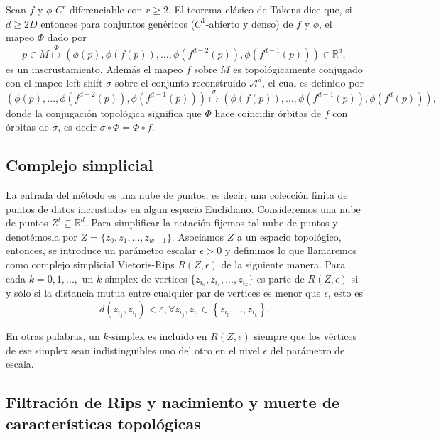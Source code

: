 Sean $f$ y $\phi$ $C^r$-diferenciable con $r\geq 2$. El teorema clásico de Takens dice que, si $d\geq 2D$ entonces para conjuntos genéricos ($C^1$-abierto y denso) de $f$ y $\phi$, el mapeo $\Phi$ dado por
\[
p \in M \stackrel{\Phi}{\mapsto}\left(\phi(p), \phi(f(p)), \ldots, \phi\left(f^{d-2}(p)\right), \phi\left(f^{d-1}(p)\right)\right) \in \mathbb{R}^{d},
\]
es un inscrustamiento. Además el mapeo $f$ sobre $M$ es topológicamente conjugado con el mapeo left-shift $\sigma$ sobre el conjunto reconstruido $\mathcal{A}^d$, el cual es definido por
\[
\left(\phi(p), \ldots, \phi\left(f^{d-2}(p)\right), \phi\left(f^{d-1}(p)\right)\right) \stackrel{\sigma}{\mapsto}\left(\phi(f(p)), \ldots, \phi\left(f^{d-1}(p)\right), \phi\left(f^{d}(p)\right)\right),
\]
donde la conjugación topológica significa que $\Phi$ hace coincidir órbitas de $f$ con órbitas de $\sigma$, es decir $\sigma \circ \Phi = \Phi \circ f$.
   
\subsection{Complejo simplicial}
\label{funda_mental_complejoSim}

La entrada del método es una nube de puntos, es decir, una colección finita de puntos de datos incrustados en algun espacio Euclidiano. Consideremos una nube de puntos ${Z^t} \subseteq  \mathbb{R}^{d}$. Para simplificar la notación fijemos tal nube de puntos y denotémosla por $Z=\{z_0,z_1,...,z_{w-1}\}$. Asociamos $Z$ a un espacio topológico, entonces, se introduce un parámetro escalar $\epsilon > 0$ y definimos lo que llamaremos como complejo simplicial Vietoris-Rips $R(Z,\epsilon)$ de la siguiente manera.
Para cada $k=0,1,...,$ un $k$-simplex de vertices $\{ z_{i_0},z_{i_1},...,z_{i_k} \}$ es parte de $R(Z,\epsilon)$ si y sólo si la distancia mutua entre cualquier par de vertices es menor que $\epsilon$, esto es
\[
d\left(z_{i_{j}}, z_{i_{l}}\right)<\varepsilon, \forall z_{i_{j}}, z_{i_{l}} \in\left\{z_{i_{0}}, \ldots, z_{i_{k}}\right\}.
\]

En otras palabras, un $k$-simplex es incluido en $R(Z,\epsilon)$ siempre que los vértices de ese simplex sean indistinguibles uno del otro en el nivel $\epsilon$ del parámetro de escala.

\subsection{Filtración de Rips y nacimiento y muerte de características topológicas}

